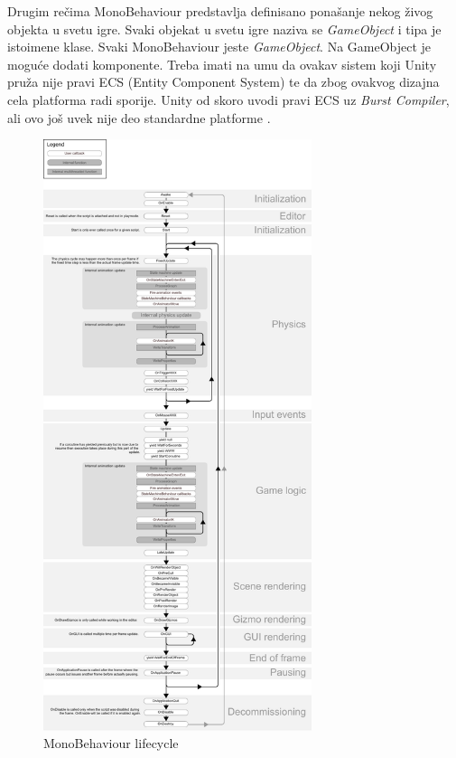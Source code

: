 Drugim re\v{c}ima MonoBehaviour predstavlja definisano pona\v{s}anje nekog \v{z}ivog objekta
u svetu igre. Svaki objekat u svetu igre naziva se \emph{GameObject} i tipa je istoimene klase. Svaki
MonoBehaviour jeste \emph{GameObject}. Na GameObject je mogu\'ce dodati komponente. Treba imati 
na umu da ovakav sistem koji Unity pru\v{z}a nije pravi ECS (Entity Component System) te da zbog ovakvog
dizajna cela platforma radi sporije. Unity od skoro uvodi pravi ECS uz \emph{Burst Compiler}, ali ovo jo\v{s} uvek 
nije deo standardne platforme \cite{unitydocs}.
\begin{center}
    \begin{figure}
        \includegraphics[width=0.7\textwidth]{Figures/mono_flowchart.pdf}
        \caption{MonoBehaviour lifecycle}
        \label{fig:monoflowchart}
    \end{figure}
\end{center}


